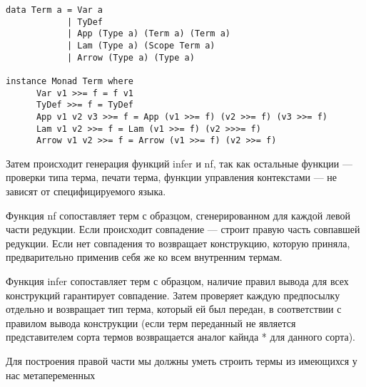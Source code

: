 \begin{lstlisting}[caption={Представление STLC и представитель класса Monad},captionpos=b, frame=single]
data Term a = Var a
            | TyDef
            | App (Type a) (Term a) (Term a)
            | Lam (Type a) (Scope Term a)
            | Arrow (Type a) (Type a)

instance Monad Term where
      Var v1 >>= f = f v1
      TyDef >>= f = TyDef
      App v1 v2 v3 >>= f = App (v1 >>= f) (v2 >>= f) (v3 >>= f)
      Lam v1 v2 >>= f = Lam (v1 >>= f) (v2 >>>= f)
      Arrow v1 v2 >>= f = Arrow (v1 >>= f) (v2 >>= f)
\end{lstlisting}

Затем происходит генерация функций infer и nf, так как остальные функции --- проверки типа терма, печати терма, функции управления контекстами --- не зависят от специфицируемого языка.

Функция nf сопоставляет терм с образцом, сгенерированном для каждой левой части редукции. Если происходит совпадение --- строит правую часть совпавшей редукции. Если нет совпадения то возвращает конструкцию, которую приняла, предварительно применив себя же ко всем внутренним термам.

Функция infer сопоставляет терм с образцом, наличие правил вывода для всех конструкций гарантирует совпадение. Затем проверяет каждую предпосылку отдельно и возвращает тип терма, который ей был передан, в соответствии с правилом вывода конструкции (если терм переданный не является представителем сорта термов возвращается аналог кайнда * для данного сорта).

Для построения правой части мы должны уметь строить термы из имеющихся у нас метапеременных












